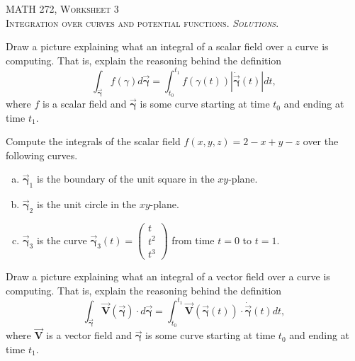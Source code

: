 \documentclass[12pt]{article} %
\newcommand{\vecfieldV}{\boldsymbol{\vec{V}}}
\newcommand{\curvegamma}{\boldsymbol{\vec{\gamma}}}
\newcommand{\tangentgamma}{\boldsymbol{\dot{\vec{\gamma}}}}
\begin{document}
\begin{center}
   \textsc{\large MATH 272, Worksheet 3}\\
   \textsc{Integration over curves and potential functions. \emph{Solutions}.}
\end{center}
\vspace{.5cm}



\begin{problem}
    Draw a picture explaining what an integral of a scalar field over a curve is computing. That is, explain the reasoning behind the definition
    \[
    \int_{\curvegamma} f(\gamma)d\curvegamma = \int_{t_0}^{t_1} f(\gamma(t))\left|\tangentgamma(t)\right|dt,
    \]
    where $f$ is a scalar field and $\curvegamma$ is some curve starting at time $t_0$ and ending at time $t_1$.
\end{problem}
\begin{solution}

\end{solution}

\newpage
\begin{problem}
Compute the integrals of the scalar field $f(x,y,z)=2-x+y-z$ over the following curves.
\begin{multicols}{2}
\begin{enumerate}[(a)]
    \item $\curvegamma_1$ is the boundary of the unit square in the $xy$-plane.  
    \item $\curvegamma_2$ is the unit circle in the $xy$-plane.
    \item $\curvegamma_3$ is the curve $\curvegamma_3(t)=\begin{pmatrix} t \\ t^2 \\ t^3 \end{pmatrix}$ from time $t=0$ to $t=1$.
\end{enumerate}
\end{multicols}
\end{problem}
\begin{solution}

\end{solution}

\newpage
\begin{problem}
    Draw a picture explaining what an integral of a vector field over a curve is computing. That is, explain the reasoning behind the definition
\[
\int_{\curvegamma} \vecfieldV(\curvegamma) \cdot d\curvegamma = \int_{t_0}^{t_1} \vecfieldV(\curvegamma(t))\cdot \tangentgamma(t) dt,
\]
where $\vecfieldV$ is a vector field and $\curvegamma$ is some curve starting at time $t_0$ and ending at time $t_1$.
\end{problem}
\begin{solution}

\end{solution}
\end{document}
